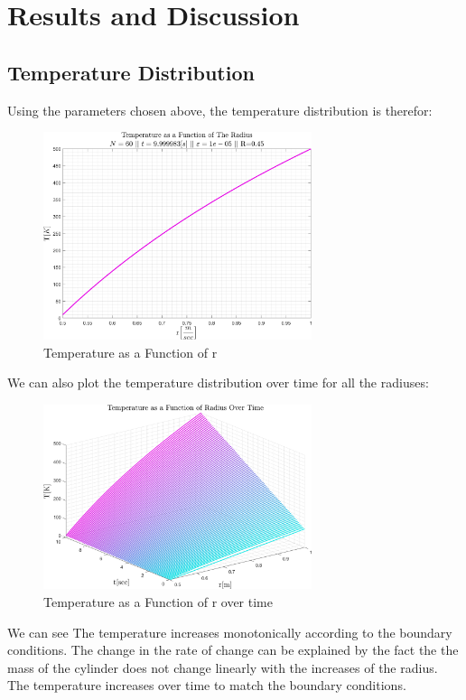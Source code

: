 \documentclass[11pt, a4paper]{article}
\begin{document}
\newpage
\section{Results and Discussion}
\label{sec: results and discussion}
\subsection{Temperature Distribution}
Using the parameters chosen above, the temperature distribution is therefor:
\begin{figure}[H]
    \centering
    \includegraphics[width=0.7\textwidth]{images/T over r.png}
    \caption{Temperature as a Function of r}
    \label{fig: T vs r}
\end{figure}
We can also plot the temperature distribution over time for all the radiuses:
\begin{figure}[H]
    \centering
    \includegraphics[width=0.7\textwidth]{images/T vs r vs t.png}
    \caption{Temperature as a Function of r over time}
    \label{fig: T vs r vs t}
\end{figure}
\noindent We can see The temperature increases monotonically according to the boundary conditions. The change in the rate of change can be explained by the fact the the mass of the cylinder does not change linearly with the increases of the radius. The temperature increases over time to match the boundary conditions.
\end{document}
